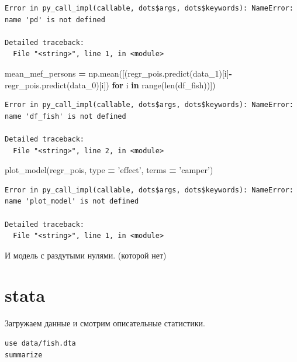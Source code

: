 \documentclass[]{book}
\newenvironment{Shaded}{\begin{snugshade}}{\end{snugshade}}
\newcommand{\BuiltInTok}[1]{#1}
\newcommand{\ControlFlowTok}[1]{\textcolor[rgb]{0.13,0.29,0.53}{\textbf{#1}}}
\newcommand{\KeywordTok}[1]{\textcolor[rgb]{0.13,0.29,0.53}{\textbf{#1}}}
\newcommand{\NormalTok}[1]{#1}
\newcommand{\OperatorTok}[1]{\textcolor[rgb]{0.81,0.36,0.00}{\textbf{#1}}}
\newcommand{\StringTok}[1]{\textcolor[rgb]{0.31,0.60,0.02}{#1}}
\begin{document}
\begin{verbatim}
Error in py_call_impl(callable, dots$args, dots$keywords): NameError: name 'pd' is not defined

Detailed traceback: 
  File "<string>", line 1, in <module>
\end{verbatim}

\begin{Shaded}
\begin{Highlighting}[]
\NormalTok{mean_mef_persons }\OperatorTok{=}\NormalTok{ np.mean([(regr_pois.predict(data_1)[i]}\OperatorTok{-}\NormalTok{regr_pois.predict(data_0)[i]) }
                            \ControlFlowTok{for}\NormalTok{ i }\KeywordTok{in} \BuiltInTok{range}\NormalTok{(}\BuiltInTok{len}\NormalTok{(df_fish))])}
\end{Highlighting}
\end{Shaded}

\begin{verbatim}
Error in py_call_impl(callable, dots$args, dots$keywords): NameError: name 'df_fish' is not defined

Detailed traceback: 
  File "<string>", line 2, in <module>
\end{verbatim}

\begin{Shaded}
\begin{Highlighting}[]
\NormalTok{plot_model(regr_pois, }\BuiltInTok{type} \OperatorTok{=} \StringTok{'effect'}\NormalTok{, terms }\OperatorTok{=} \StringTok{'camper'}\NormalTok{)}
\end{Highlighting}
\end{Shaded}

\begin{verbatim}
Error in py_call_impl(callable, dots$args, dots$keywords): NameError: name 'plot_model' is not defined

Detailed traceback: 
  File "<string>", line 1, in <module>
\end{verbatim}

И модель с раздутыми нулями. (которой нет)

\hypertarget{stata-1}{%
\section{stata}\label{stata-1}}

Загружаем данные и смотрим описательные статистики.

\begin{verbatim}
use data/fish.dta
summarize
\end{verbatim}
\end{document}
